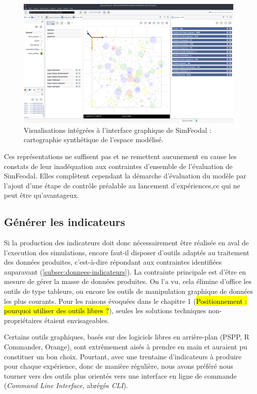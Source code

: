 \begin{figure}[H]
	\captionsetup{width=\linewidth}
	\includegraphics[width=\linewidth]{img/SimFeodal_GUI_carte.png}
	\caption{Visualisations intégrées à l'interface graphique de SimFeodal : cartographie synthétique de l'espace modélisé.} 
	\label{fig:simfeodal_gui_carte} 
\end{figure}
	
	Ces représentations ne suffisent pas et ne remettent aucunement en cause les constats de leur inadéquation aux contraintes d'ensemble de l'évaluation de SimFeodal.
	Elles complètent cependant la démarche d'évaluation du modèle par l'ajout d'une étape de contrôle préalable au lancement d'expériences,ce qui ne peut être qu'avantageux.

	\subsection{Générer les indicateurs}

	Si la production des indicateurs doit donc nécessairement être réalisée en aval de l'execution des simulations, encore faut-il disposer d'outils adaptés au traitement des données produites, c'est-à-dire répondant aux contraintes identifiées auparavant (\autoref{subsec:donnees-indicateurs}).
	La contrainte principale est d'être en mesure de gérer la masse de données produites.
	On l'a vu, cela élimine d'office les outils de type tableurs, ou encore les outils de manipulation graphique de données les plus courants.
	Pour les raisons évoquées dans le chapitre 1 (\hl{Positionnement : pourquoi utiliser des outils libres ?}), seules les solutions techniques non-propriétaires étaient envisageables.

	Certains outils graphiques, basés sur des logiciels libres en arrière-plan (PSPP, R Commander, Orange), sont extrêmement aisés à prendre en main et auraient pu constituer un bon choix.
	Pourtant, avec une trentaine d'indicateurs à produire pour chaque expérience, donc de manière régulière, nous avons préféré nous tourner vers des outils plus orientés vers une interface en ligne de commande (\textit{Command Line Interface}, abrégés \textit{CLI}).
	

